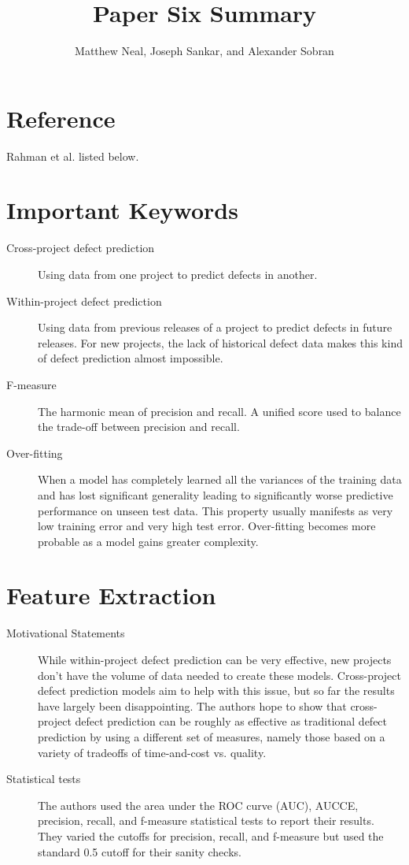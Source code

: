 \documentclass[english]{article}
\begin{document}
\title{Paper Six Summary}


\author{Matthew Neal, Joseph Sankar, and Alexander Sobran}

\maketitle

\section*{Reference}

Rahman et al. \cite{Rahman} listed below.


\section*{Important Keywords}
\begin{description}
\item [{Cross-project defect prediction}] Using data from one project to predict defects in another.
\item [{Within-project defect prediction}] Using data from previous releases of a project to predict defects in future releases. For new projects, the lack of historical defect data makes this kind of defect prediction almost impossible.
\item[{F-measure}] The harmonic mean of precision and recall. A unified score used to balance the trade-off between precision and recall.
\item[{Over-fitting}] When a model has completely learned all the variances of the training data and has lost significant generality leading to significantly worse predictive performance on unseen test data. This property usually manifests as very low training error and very high test error. Over-fitting becomes more probable as a model gains greater complexity.

\end{description}

\section*{Feature Extraction}
\begin{description}
\item[{Motivational Statements}]  While within-project defect prediction can be very effective, new projects don't have the volume of data needed to create these models. Cross-project defect prediction models aim to help with this issue, but so far the results have largely been disappointing. The authors hope to show that cross-project defect prediction can be roughly as effective as traditional defect prediction by using a different set of measures, namely those based on a variety of tradeoffs of time-and-cost vs. quality.
\item[{Statistical tests}] The authors used the area under the ROC curve (AUC), AUCCE, precision, recall, and f-measure statistical tests to report their results. They varied the cutoffs for precision, recall, and f-measure but used the standard 0.5 cutoff for their sanity checks.

\end{description}
\end{document}
